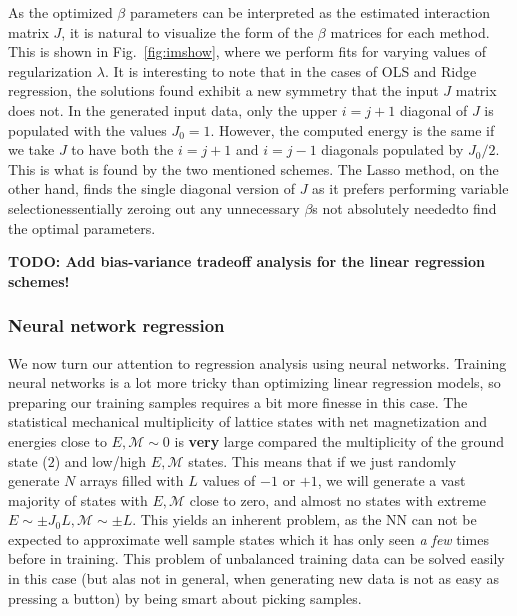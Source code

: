 \documentclass[a4paper, twocolumn]{article}
\newcommand{\fig}[1]{Fig.\ \ref{fig:#1}}
\begin{document}
As the optimized $\beta$ parameters can be interpreted as the estimated interaction matrix $J$, it is natural to visualize the form of the $\beta$ matrices for each method. This is shown in \fig{imshow}, where we perform fits for varying values of regularization $\lambda$. It is interesting to note that in the cases of OLS and Ridge regression, the solutions found exhibit a new symmetry that the input $J$ matrix does not. In the generated input data, only the upper $i=j+1$ diagonal of $J$ is populated with the values $J_0=1$. However, the computed energy is the same if we take $J$ to have both the $i=j+1$ and $i=j-1$ diagonals populated by $J_0/2$. This is what is found by the two mentioned schemes. The Lasso method, on the other hand, finds the single diagonal version of $J$ as it prefers performing variable selection\textemdash essentially zeroing out any unnecessary $\beta$s not absolutely needed\textemdash to find the optimal parameters.

\textbf{{\color{red} TODO: Add bias-variance tradeoff analysis for the linear regression schemes!}}

\subsubsection{Neural network regression}
We now turn our attention to regression analysis using neural networks. Training neural networks is a lot more tricky than optimizing linear regression models, so preparing our training samples requires a bit more finesse in this case. The statistical mechanical multiplicity of lattice states with net magnetization and energies close to $E,\mathcal{M}\sim0$ is \textbf{very} large compared the multiplicity of the ground state ($2$) and low/high $E,\mathcal{M}$ states. This means that if we just randomly generate $N$ arrays filled with $L$ values of $-1$ or $+1$, we will generate a vast majority of states with $E,\mathcal{M}$ close to zero, and almost no states with extreme $E\sim\pm J_0L,\mathcal{M}\sim \pm L$. This yields an inherent problem, as the NN can not be expected to approximate well sample states which it has only seen \textit{a few} times before in training. This problem of unbalanced training data can be solved easily in this case (but alas not in general, when generating new data is not as easy as pressing a button) by being smart about picking samples.
\end{document}
